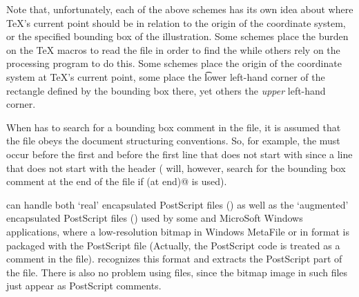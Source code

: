 Note that, unfortunately, each of the above schemes has its own idea about
where {\TeX}'s current point should be in relation to the origin of the
coordinate system, or the specified bounding box of the illustration.
Some schemes place the burden on the {\TeX} macros to read the {\EPS} file 
in order to find the \verb@%%BoundingBox@ comment, 
while others rely on the {\DVI} processing program to do this.
Some schemes place the origin of the coordinate system 
at {\TeX}'s current point,
some place the {\t lower\/} left-hand corner of the rectangle defined by the
bounding box there, yet others the {\it upper\/} left-hand corner.

When {\DVIPSONE} has to search for a bounding box comment in the
{\EPS} file, it is assumed that the file obeys the {\EPS} 
document structuring conventions. %
So, for example, the \verb@%%BoundingBox:@ line
must occur before the first \verb@%%EndComments@ line, 
and before the first line that does not start with \verb@%%@,
since a line that does not start with \verb@%%@ signals the end of
the header
({\DVIPSONE} will, however, search for the bounding box comment at the
end of the file if \verb@(at end)@ is used).



{\DVIPSONE} can handle both `real' encapsulated Post\-Script files ({\EPS})
as well as the `augmented' encapsulated Post\-Script files ({\EPSF})
used by some {\DOS} and MicroSoft Windows applications, where a low-resolution
bitmap in Windows MetaFile or in {\TIFF} format is packaged with the
Post\-Script file
(Actually, the Post\-Script code is treated as a comment in the {\TIFF} file).
{\DVIPSONE} recognizes this format and extracts the Post\-Script part
of the file. %
%
There is also no problem using {\EPSI} files, since the bitmap image in
such files just appear as Post\-Script comments.

